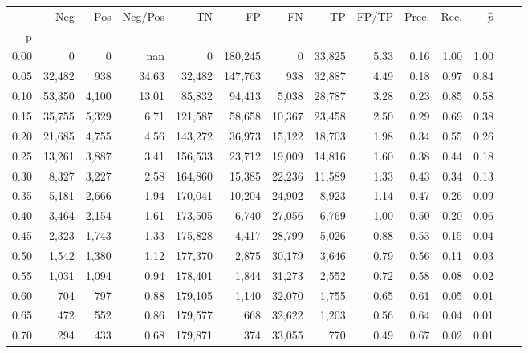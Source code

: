 \begin{tabular}{rrrrrrrrrrrrrr}
\toprule
{} &     Neg &    Pos & Neg/Pos &       TN &       FP &      FN &      TP & FP/TP & Prec. &  Rec. & $\hat{p}$ \\
p    &         &        &         &          &          &         &         &       &       &       &           \\
\midrule
0.00 &       0 &      0 &     nan &        0 &  180,245 &       0 &  33,825 &  5.33 &  0.16 &  1.00 &      1.00 \\
0.05 &  32,482 &    938 &   34.63 &   32,482 &  147,763 &     938 &  32,887 &  4.49 &  0.18 &  0.97 &      0.84 \\
0.10 &  53,350 &  4,100 &   13.01 &   85,832 &   94,413 &   5,038 &  28,787 &  3.28 &  0.23 &  0.85 &      0.58 \\
0.15 &  35,755 &  5,329 &    6.71 &  121,587 &   58,658 &  10,367 &  23,458 &  2.50 &  0.29 &  0.69 &      0.38 \\
0.20 &  21,685 &  4,755 &    4.56 &  143,272 &   36,973 &  15,122 &  18,703 &  1.98 &  0.34 &  0.55 &      0.26 \\
0.25 &  13,261 &  3,887 &    3.41 &  156,533 &   23,712 &  19,009 &  14,816 &  1.60 &  0.38 &  0.44 &      0.18 \\
0.30 &   8,327 &  3,227 &    2.58 &  164,860 &   15,385 &  22,236 &  11,589 &  1.33 &  0.43 &  0.34 &      0.13 \\
0.35 &   5,181 &  2,666 &    1.94 &  170,041 &   10,204 &  24,902 &   8,923 &  1.14 &  0.47 &  0.26 &      0.09 \\
0.40 &   3,464 &  2,154 &    1.61 &  173,505 &    6,740 &  27,056 &   6,769 &  1.00 &  0.50 &  0.20 &      0.06 \\
0.45 &   2,323 &  1,743 &    1.33 &  175,828 &    4,417 &  28,799 &   5,026 &  0.88 &  0.53 &  0.15 &      0.04 \\
0.50 &   1,542 &  1,380 &    1.12 &  177,370 &    2,875 &  30,179 &   3,646 &  0.79 &  0.56 &  0.11 &      0.03 \\
0.55 &   1,031 &  1,094 &    0.94 &  178,401 &    1,844 &  31,273 &   2,552 &  0.72 &  0.58 &  0.08 &      0.02 \\
0.60 &     704 &    797 &    0.88 &  179,105 &    1,140 &  32,070 &   1,755 &  0.65 &  0.61 &  0.05 &      0.01 \\
0.65 &     472 &    552 &    0.86 &  179,577 &      668 &  32,622 &   1,203 &  0.56 &  0.64 &  0.04 &      0.01 \\
0.70 &     294 &    433 &    0.68 &  179,871 &      374 &  33,055 &     770 &  0.49 &  0.67 &  0.02 &      0.01 \\

\end{tabular}
